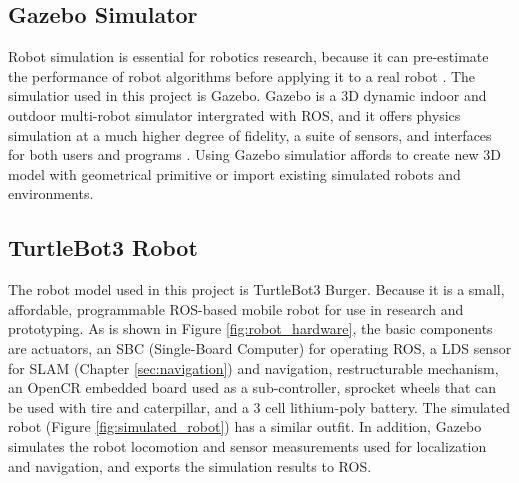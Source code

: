 \subsection{Gazebo Simulator}
Robot simulation is essential for robotics research, because it can pre-estimate the performance of robot algorithms before applying it to a real robot \cite{Afanasyev2015}. 
The simulatior used in this project is Gazebo. Gazebo is a 3D dynamic indoor and outdoor multi-robot simulator intergrated with ROS, and it offers physics simulation at a much higher degree of fidelity, a suite of sensors, and interfaces for both users and programs \cite{GZ}. 
Using Gazebo simulatior affords to create new 3D model with geometrical primitive or import existing simulated robots and environments. 

\subsection{TurtleBot3 Robot}
The robot model used in this project is TurtleBot3 Burger. Because it is a small, affordable, programmable ROS-based mobile robot for use in research and prototyping. 
As is shown in Figure \ref{fig:robot_hardware}, the basic components are actuators, an SBC (Single-Board Computer) for operating ROS, a LDS sensor for SLAM (Chapter \ref{sec:navigation}) and navigation, restructurable mechanism, an OpenCR embedded board used as a sub-controller, sprocket wheels that can be used with tire and caterpillar, and a 3 cell lithium-poly battery.
The simulated robot (Figure  \ref{fig:simulated_robot}) has a similar outfit. In addition, Gazebo simulates the robot locomotion and sensor measurements used for localization and navigation, and exports the simulation results to ROS.



